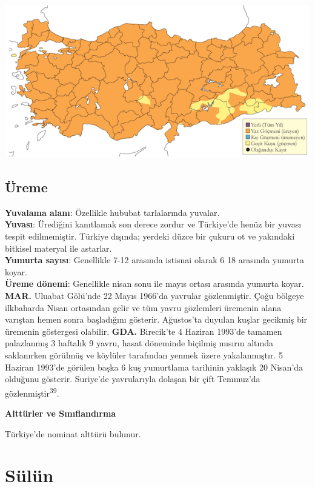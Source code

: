 \documentclass[
  letterpaper,
  DIV=11,
  numbers=noendperiod]{scrreprt}
\begin{document}
\includegraphics{images/harita_Page_043.png}

\subsection{\texorpdfstring{\textbf{Üreme}}{Üreme}}\label{uxfcreme-7}

\textbf{Yuvalama alanı}: Özellikle hububat tarlalarında yuvalar.\\
\textbf{Yuvası}: Ürediğini kanıtlamak son derece zordur ve Türkiye'de
henüz bir yuvası tespit edilmemiştir. Türkiye dışında; yerdeki düzce bir
çukuru ot ve yakındaki bitkisel materyal ile astarlar.\\
\textbf{Yumurta sayısı}: Genellikle 7-12 arasında istisnai olarak 6 18
arasında yumurta koyar.\\
\textbf{Üreme dönemi}: Genellikle nisan sonu ile mayıs ortası arasında
yumurta koyar. \textbf{MAR.} Uluabat Gölü'nde 22 Mayıs 1966'da yavrular
gözlenmiştir. Çoğu bölgeye ilkbaharda Nisan ortasından gelir ve tüm
yavru gözlemleri üremenin alana varıştan hemen sonra başladığını
gösterir. Ağustos'ta duyulan kuşlar gecikmiş bir üremenin göstergesi
olabilir. \textbf{GDA.} Birecik'te 4 Haziran 1993'de tamamen palazlanmış
3 haftalık 9 yavru, hasat döneminde biçilmiş mısırın altında saklanırken
görülmüş ve köylüler tarafından yenmek üzere yakalanmıştır. 5 Haziran
1993'de görülen başka 6 kuş yumurtlama tarihinin yaklaşık 20 Nisan'da
olduğunu gösterir. Suriye'de yavrularıyla dolaşan bir çift Temmuz'da
gözlenmiştir\textsuperscript{39}.

\textbf{Alttürler ve Sınıflandırma}

Türkiye'de nominat alttürü bulunur.

\section{Sülün}\label{suxfcluxfcn}
\end{document}

